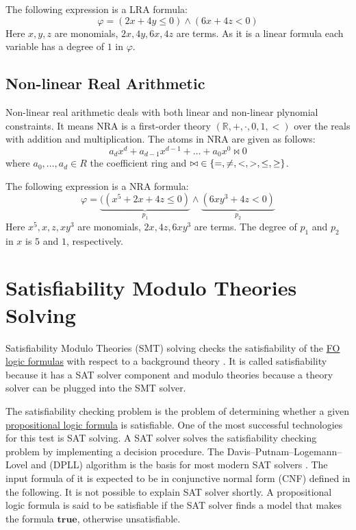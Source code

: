 \begin{example}
    The following expression is a LRA formula:
    $$ \varphi = ( 2x+4y\leq 0 ) \wedge ( 6x+4z< 0 )$$
    Here $x, y, z$ are monomials, $2x, 4y, 6x, 4z$ are terms.
    As it is a linear formula each variable has a degree of $1$ in $\varphi$.
\end{example}
\subsection{Non-linear Real Arithmetic}
\label{subsec:NRA}
Non-linear real arithmetic deals with both linear and non-linear plynomial constraints.
It means NRA is a first-order theory $(\mathbb{R}, +, \cdot, 0, 1, <)$ over the reals with addition and multiplication.
The atoms in NRA are given as follows:
$$ a_{d}x^{d} + a_{d-1}x^{d-1} + \ldots + a_{0}x^{0} \bowtie 0  $$
where $ a_{0}, \ldots, a_{d} \in R $ the coefficient ring and $ \bowtie \hspace{1mm}\in \{=, \neq, <, >, \leq, \geq \} $.\newline

\begin{example}
    The following expression is a NRA formula:
    $$ \varphi = \underbrace{ ( (x^{5}+2x+4z\leq 0 ) }\limits_{p_{1}} \wedge \underbrace{ ( 6xy^{3}+4z< 0 ) }\limits_{p_{2}} $$
    Here $x^{5}, x, z, xy^{3}$ are monomials, $2x, 4z, 6xy^{3}$ are terms.
    The degree of $p_{1}$ and $p_{2}$ in $x$ is $5$ and $1$, respectively.
\end{example}
\section{Satisfiability Modulo Theories Solving}
\label{sec:SMT_Solver}
Satisfiability Modulo Theories (SMT) solving checks the satisfiability of the \hyperref[sec:FOLogic]{FO logic formulas} with respect to a background theory \cite{de2007tutorial}.
It is called satisfiability because it has a SAT solver component and modulo theories because a theory solver can be plugged into the SMT solver.\newline

\noindent The satisfiability checking problem is the problem of determining whether a given \hyperref[sec:PropositionalLogic]{propositional logic formula} is satisfiable.
One of the most successful technologies for this test is SAT solving.
A SAT solver solves the satisfiability checking problem by implementing a decision procedure.
The Davis–Putnam–Logemann–Lovel and (DPLL) algorithm is the basis for most modern SAT solvers \cite{wiki:DPLL_algorithm}.
The input formula of it is expected to be in conjunctive normal form (CNF) defined in the following.
It is not possible to explain SAT solver shortly.
A propositional logic formula is said to be satisfiable if the SAT solver finds a model that makes the formula $\mathbf{true}$, otherwise unsatisfiable.\newline

